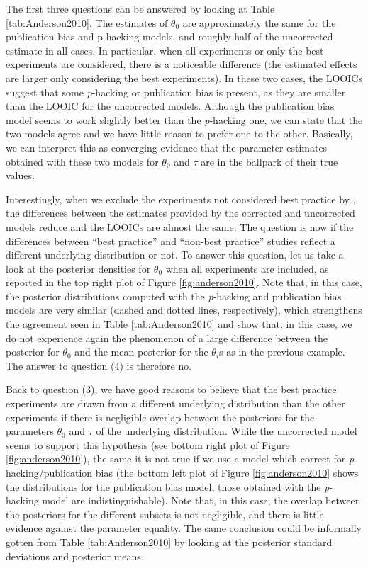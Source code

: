 \documentclass{article}
\theoremstyle{plain}
\theoremstyle{definition}
\begin{document}


The first three questions can be answered by looking at Table \ref{tab:Anderson2010}. The estimates of $\theta_{0}$ are approximately the same for the publication bias and p-hacking models, and roughly half of the uncorrected estimate in all cases. In particular, when all experiments or only the best experiments are considered, there is a noticeable difference (the estimated effects are larger only considering the best experiments). In these two cases, the LOOICs suggest that some \textit{p}-hacking or publication bias is present, as they are smaller than the LOOIC for the uncorrected models. Although the publication bias model seems to work slightly better than the \textit{p}-hacking one, we can state that the two models agree and we have little reason to prefer one to the other. Basically, we can interpret this as converging evidence that the parameter estimates obtained with these two models for $\theta_{0}$ and $\tau$ are in the ballpark of their true values.

Interestingly, when we exclude the experiments not considered best practice by \citet{anderson2010violent}, the differences between the estimates provided by the corrected and uncorrected models reduce and the LOOICs are almost the same. The question is now if the differences between ``best practice'' and ``non-best practice'' studies reflect a different underlying distribution or not. To answer this question, let us take a look at the posterior densities for $\theta_{0}$ when all experiments are included, as reported in the top right plot of Figure \ref{fig:anderson2010}. Note that, in this case, the posterior distributions computed with the \textit{p}-hacking and publication bias models are very similar (dashed and dotted lines, respectively), which strengthens the agreement seen in Table \ref{tab:Anderson2010} and show that, in this case, we do not experience again the phenomenon of a large difference between the posterior for $\theta_{0}$ and the mean posterior for the $\theta_{i}$s as in the previous example. The answer to question (4) is therefore no.

Back to question (3), we have good reasons to believe that the best practice experiments are drawn from a different underlying distribution than the other experiments if there is negligible overlap between the posteriors for the parameters $\theta_{0}$ and $\tau$ of the underlying distribution. While the uncorrected model seems to support this hypothesis (see bottom right plot of Figure \ref{fig:anderson2010}), the same it is not true if we use a model which correct for \textit{p}-hacking/publication bias (the bottom left plot of Figure \ref{fig:anderson2010} shows the distributions for the publication bias model, those obtained with the \textit{p}-hacking model are indistinguishable). Note that, in this case, the overlap between the posteriors for the different subsets is not negligible, and there is little evidence against the parameter equality. The same conclusion could be informally gotten from Table \ref{tab:Anderson2010} by looking at the posterior standard deviations and posterior means.
\end{document}
